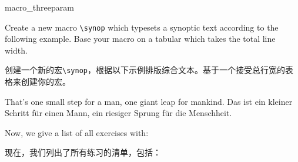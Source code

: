 \begin{dispExample}
\begin{texercise}{macro_threeparam}
\begin{tcboutputlisting}
\newcommand{\synop}[3]{%
\begin{tabular}{@{}p{(\linewidth-\tabcolsep*2-\arrayrulewidth)/2}|%
p{(\linewidth-\tabcolsep*2-\arrayrulewidth)/2}@{}}\hline
\multicolumn{2}{c}{\bfseries #1}\\\hline
\multicolumn{1}{c|}{\itshape English}&
\multicolumn{1}{c}{\itshape German}\\\hline
#2 & #3
\end{tabular}}
\end{tcboutputlisting}
\tcbuselistingtext%
Create a new macro \verb+\synop+ which typesets a synoptic text according
to the following example. Base your macro on a tabular which takes the
total line width.

创建一个新的宏\verb+\synop+，根据以下示例排版综合文本。基于一个接受总行宽的表格来创建你的宏。\par\smallskip
\begin{tcbwritetemp}
%
{That's one small step for a man, one giant leap for mankind.}%
{Das ist ein kleiner Schritt f\"{u}r einen Mann,
ein riesiger Sprung f\"{u}r die Menschheit.}
\end{tcbwritetemp}
\tcbusetemplisting\par\smallskip\tcbusetemp%
\end{texercise}
\end{dispExample}

\begin{dispListing}
\tcbstoprecording
\end{dispListing}
\tcbusetemp

\bigskip

Now, we give a list of all exercises with:

现在，我们列出了所有练习的清单，包括：
\begin{dispListing}
\end{dispListing}
\tcbusetemp